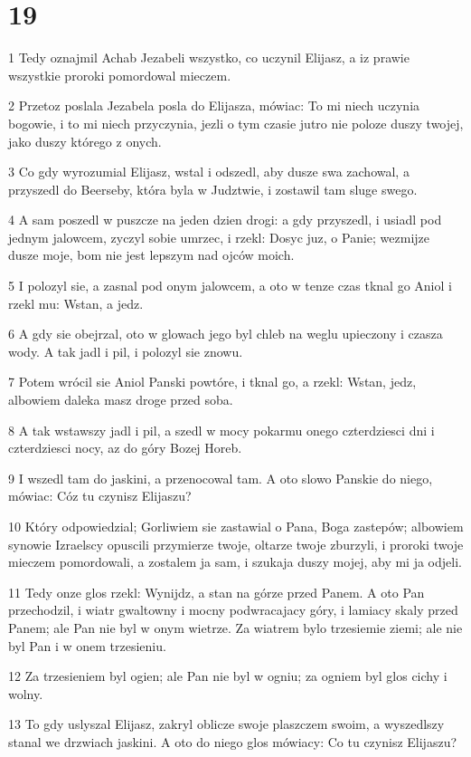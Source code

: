 \chapter{19}

\par 1 Tedy oznajmil Achab Jezabeli wszystko, co uczynil Elijasz, a iz prawie wszystkie proroki pomordowal mieczem.
\par 2 Przetoz poslala Jezabela posla do Elijasza, mówiac: To mi niech uczynia bogowie, i to mi niech przyczynia, jezli o tym czasie jutro nie poloze duszy twojej, jako duszy którego z onych.
\par 3 Co gdy wyrozumial Elijasz, wstal i odszedl, aby dusze swa zachowal, a przyszedl do Beerseby, która byla w Judztwie, i zostawil tam sluge swego.
\par 4 A sam poszedl w puszcze na jeden dzien drogi: a gdy przyszedl, i usiadl pod jednym jalowcem, zyczyl sobie umrzec, i rzekl: Dosyc juz, o Panie; wezmijze dusze moje, bom nie jest lepszym nad ojców moich.
\par 5 I polozyl sie, a zasnal pod onym jalowcem, a oto w tenze czas tknal go Aniol i rzekl mu: Wstan, a jedz.
\par 6 A gdy sie obejrzal, oto w glowach jego byl chleb na weglu upieczony i czasza wody. A tak jadl i pil, i polozyl sie znowu.
\par 7 Potem wrócil sie Aniol Panski powtóre, i tknal go, a rzekl: Wstan, jedz, albowiem daleka masz droge przed soba.
\par 8 A tak wstawszy jadl i pil, a szedl w mocy pokarmu onego czterdziesci dni i czterdziesci nocy, az do góry Bozej Horeb.
\par 9 I wszedl tam do jaskini, a przenocowal tam. A oto slowo Panskie do niego, mówiac: Cóz tu czynisz Elijaszu?
\par 10 Który odpowiedzial; Gorliwiem sie zastawial o Pana, Boga zastepów; albowiem synowie Izraelscy opuscili przymierze twoje, oltarze twoje zburzyli, i proroki twoje mieczem pomordowali, a zostalem ja sam, i szukaja duszy mojej, aby mi ja odjeli.
\par 11 Tedy onze glos rzekl: Wynijdz, a stan na górze przed Panem. A oto Pan przechodzil, i wiatr gwaltowny i mocny podwracajacy góry, i lamiacy skaly przed Panem; ale Pan nie byl w onym wietrze. Za wiatrem bylo trzesiemie ziemi; ale nie byl Pan i w onem trzesieniu.
\par 12 Za trzesieniem byl ogien; ale Pan nie byl w ogniu; za ogniem byl glos cichy i wolny.
\par 13 To gdy uslyszal Elijasz, zakryl oblicze swoje plaszczem swoim, a wyszedlszy stanal we drzwiach jaskini. A oto do niego glos mówiacy: Co tu czynisz Elijaszu?

